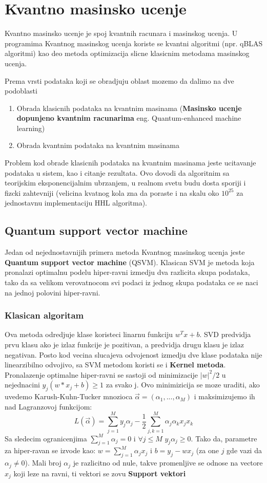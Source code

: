 \documentclass[12pt, letterpaper, oneside]{article}
\begin{document}
\section{Kvantno masinsko ucenje}
Kvantno masinsko ucenje je spoj kvantnih racunara i masinskog ucenja. U programima Kvantnog masinskog ucenja koriste se kvantni algoritmi (npr. qBLAS algoritmi)
kao deo metoda optimizacija slicne klasicnim metodama masinskog ucenja. 

Prema vrsti podataka koji se obradjuju oblast mozemo da dalimo na dve podoblasti
\begin{enumerate}
    \item Obrada klasicnih podataka na kvantnim masinama (\textbf{Masinsko ucenje dopunjeno kvantnim racunarima} eng. Quantum-enhanced machine learning)
    \item Obrada kvantnim podataka na kvantnim masinama
\end{enumerate}
Problem kod obrade klasicnih podataka na kvantnim masinama jeste ucitavanje podataka u sistem, kao i citanje rezultata. Ovo dovodi da algoritnim sa teorijskim eksponencijalnim
ubrzanjem, u realnom svetu budu dosta sporiji i fizcki zahtevniji (velicina kvatnog kola zna da poraste i na skalu oko $10^{25}$ za jednostavnu implementaciju HHL algoritma). \cite{Quantum_machine_learning}

\subsection{Quantum support vector machine}
Jedan od nejednostavnijih primera metoda Kvantnog masinskog ucenja jeste \textbf{Quantum support vector machine} (QSVM). Klasican SVM je metoda koja pronalazi optimalnu podelu hiper-ravni
izmedju dva razlicita skupa podataka, tako da sa velikom verovatnocom svi podaci iz jednog skupa podataka ce se naci na jednoj polovini hiper-ravni. \cite{Quantum_machine_learning}
\subsubsection{Klasican algoritam}
Ova metoda odredjuje klase koristeci linarnu funkciju $w^{T}x + b$. SVD predvidja prvu klasu ako je izlaz funkcije je pozitivan, a predvidja drugu klasu je izlaz negativan.
Posto kod vecina slucajeva odvojenost izmedju dve klase podataka nije linearzibilno odvojivo, sa SVM metodom koristi se i \textbf{Kernel metoda}. \\
Pronalazenje optimalne hiper-ravni se sastoji od minimizacije $|w|^{2}/2$ u nejednacini $y_j(w*x_j+b) \geq 1$ za svako j. 
Ovo minimizicija se moze uraditi, ako uvedemo Karush-Kuhn-Tucker mnozioca $\overrightarrow{\alpha} = (\alpha_1,...,\alpha_M)$ i maksimizujemo ih nad Lagranzovoj funkcijom:
\[
    L(\overrightarrow{\alpha}) = \sum_{j=1}^{M}{y_j\alpha_j} - \frac{1}{2}\sum_{j,k=1}^{M}{\alpha_j\alpha_kx_jx_k}
\]
Sa sledecim ogranicenjima $\sum_{j=1}^{M}{\alpha_j=0}$ i $\forall j \leq M $ $y_j\alpha_j \geq 0$. Tako da, parametre za hiper-ravan se izvode kao:
$w = \sum_{j=1}^{M}\alpha_jx_j$ i $b = y_j - wx_j$ (za one $j$ gde vazi da $\alpha_j \neq 0$). Mali broj $\alpha_j$ je razlicitno od nule, takve promenljive se odnose na vectore $x_j$ koji leze na ravni,
ti vektori se zovu \textbf{Support vektori} \cite{rebentrost2014quantum}
\end{document}
